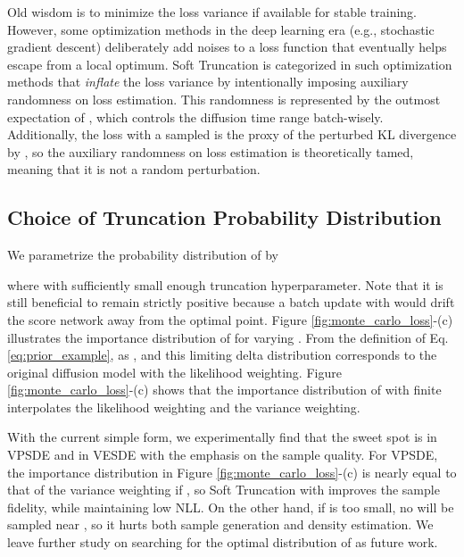 \documentclass[nohyperref]{article}
\theoremstyle{plain}
\theoremstyle{definition}
\theoremstyle{remark}
\begin{document}
Old wisdom is to minimize the loss variance if available for stable training. However, some optimization methods in the deep learning era (e.g., stochastic gradient descent) deliberately add noises to a loss function that eventually helps escape from a local optimum. Soft Truncation is categorized in such optimization methods that \textit{inflate} the loss variance by intentionally imposing auxiliary randomness on loss estimation. This randomness is represented by the outmost expectation of , which controls the diffusion time range batch-wisely. Additionally, the loss with a sampled  is the proxy of the perturbed KL divergence by , so the auxiliary randomness on loss estimation is theoretically tamed, meaning that it is not a random perturbation.

\subsection{Choice of Truncation Probability Distribution}

We parametrize the probability distribution of  by 

where  with sufficiently small enough truncation hyperparameter. Note that it is still beneficial to remain  strictly positive because a batch update with  would drift the score network away from the optimal point. Figure \ref{fig:monte_carlo_loss}-(c) illustrates the importance distribution of  for varying . From the definition of Eq. \eqref{eq:prior_example},  as , and this limiting delta distribution corresponds to the original diffusion model with the likelihood weighting. Figure \ref{fig:monte_carlo_loss}-(c) shows that the importance distribution of  with finite  interpolates the likelihood weighting and the variance weighting. 

With the current simple form, we experimentally find that the sweet spot is  in VPSDE and  in VESDE with the emphasis on the sample quality. For VPSDE, the importance distribution in Figure \ref{fig:monte_carlo_loss}-(c) is nearly equal to that of the variance weighting if , so Soft Truncation with  improves the sample fidelity, while maintaining low NLL. On the other hand, if  is too small, no  will be sampled near , so it hurts both sample generation and density estimation. We leave further study on searching for the optimal distribution of  as future work. 
\end{document}
